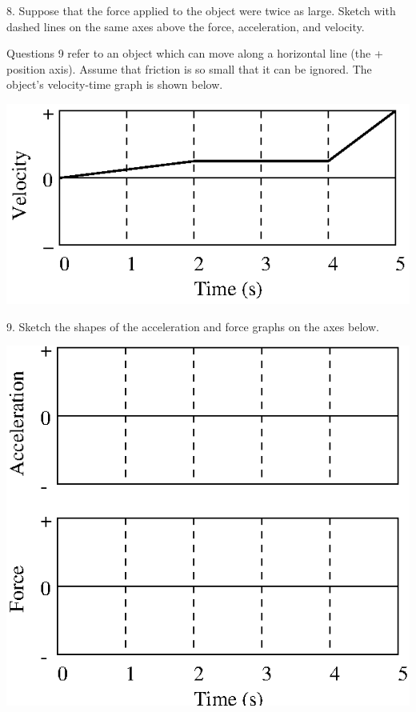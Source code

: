 8. Suppose that the force applied to the object were twice as large. Sketch
with dashed lines on the same axes above the force, acceleration, and velocity.

Questions 9 refer to an object which can move along a horizontal line (the +
position axis). Assume that friction is so small that it can be ignored. The
object's velocity-time graph is shown below.

\vspace{0.3cm}
{\par\centering \includegraphics{force1_fig12.eps} \par}
\vspace{0.3cm}

9. Sketch the shapes of the acceleration and force graphs on the axes below.

\vspace{0.3cm}
{\par\centering \includegraphics{force1_fig9.eps} \par}
\vspace{0.3cm}

